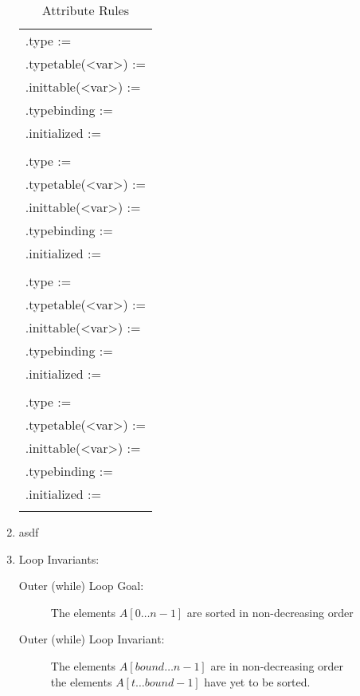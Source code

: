 \documentclass{article}
\begin{document}
\begin{enumerate}
\begin{longtable}[t]{P{1}}
.type := \\
.typetable(<var>) := \\
.inittable(<var>) := \\
.typebinding := \\
.initialized := \\\\

.type := \\
.typetable(<var>) := \\
.inittable(<var>) := \\
.typebinding := \\
.initialized := \\\\

.type := \\
.typetable(<var>) := \\
.inittable(<var>) := \\
.typebinding := \\
.initialized := \\\\

.type := \\
.typetable(<var>) := \\
.inittable(<var>) := \\
.typebinding := \\
.initialized := \\
\caption{Attribute Rules}
\end{longtable}

\item asdf
\item Loop Invariants: 
    \begin{description}
    \item [Outer (while) Loop Goal:] The elements $A[0\dots n-1]$ are sorted in non-decreasing order
    \item [Outer (while) Loop Invariant:] The elements $A[bound \dots n-1]$ are in non-decreasing order \et\\
                                          the elements $A[t\dots bound-1]$ have yet to be sorted.
                                          

\end{description}
\end{enumerate}
\end{document}
